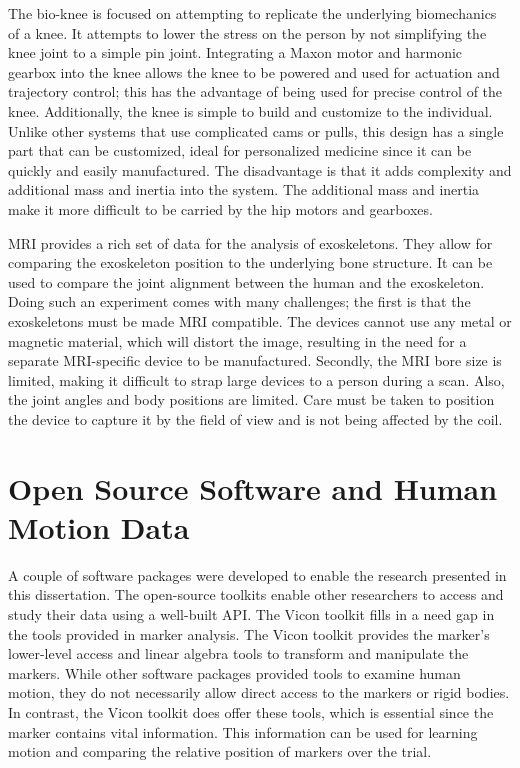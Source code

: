 The bio-knee is focused on attempting to replicate the underlying biomechanics of a knee. It attempts to lower the stress on the person by not simplifying the knee joint to a simple pin joint. Integrating a Maxon motor and harmonic gearbox into the knee allows the knee to be powered and used for actuation and trajectory control; this has the advantage of being used for precise control of the knee. Additionally, the knee is simple to build and customize to the individual. Unlike other systems that use complicated cams or pulls, this design has a single part that can be customized, ideal for personalized medicine since it can be quickly and easily manufactured. The disadvantage is that it adds complexity and additional mass and inertia into the system. The additional mass and inertia make it more difficult to be carried by the hip motors and gearboxes.

MRI provides a rich set of data for the analysis of exoskeletons. They allow for comparing the exoskeleton position to the underlying bone structure. It can be used to compare the joint alignment between the human and the exoskeleton. Doing such an experiment comes with many challenges; the first is that the exoskeletons must be made MRI compatible. The devices cannot use any metal or magnetic material, which will distort the image, resulting in the need for a separate MRI-specific device to be manufactured. Secondly, the MRI bore size is limited, making it difficult to strap large devices to a person during a scan. Also, the joint angles and body positions are limited. Care must be taken to position the device to capture it by the field of view and is not being affected by the coil. 


\section{Open Source Software and Human Motion Data}

A couple of software packages were developed to enable the research presented in this dissertation. The open-source toolkits enable other researchers to access and study their data using a well-built API. The Vicon toolkit fills in a need gap in the tools provided in marker analysis. The Vicon toolkit provides the marker's lower-level access and linear algebra tools to transform and manipulate the markers. While other software packages provided tools to examine human motion, they do not necessarily allow direct access to the markers or rigid bodies. In contrast, the Vicon toolkit does offer these tools, which is essential since the marker contains vital information. This information can be used for learning motion and comparing the relative position of markers over the trial. 


